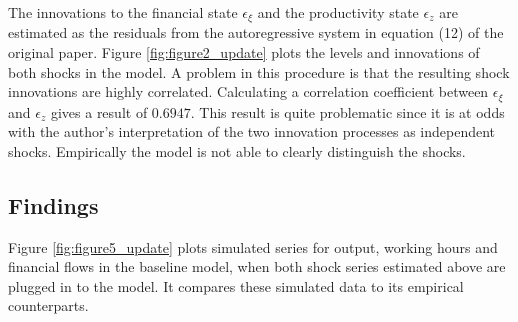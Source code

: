 

The innovations to the financial state \(\epsilon_{\xi}\) and the productivity
state \(\epsilon_{z}\) are estimated as the residuals from the autoregressive
system in equation (12) of the original paper. Figure \ref{fig:figure2_update}
plots the levels and innovations of both shocks in the model. A problem in this
procedure is that the resulting shock innovations are highly
correlated. Calculating a correlation coefficient between \(\epsilon_{\xi}\)
and \(\epsilon_z\) gives a result of $0.6947$. This result is
quite problematic since it is at odds with the author's interpretation of the
two innovation processes as independent shocks. Empirically the model is not
able to clearly distinguish the shocks.

%         

\subsection{Findings}
\label{sec:findings}

Figure \ref{fig:figure5_update} plots simulated series for output, working
hours and financial flows in the baseline model, when both shock series
estimated above are plugged in to the model. It compares these simulated data
to its empirical counterparts.


